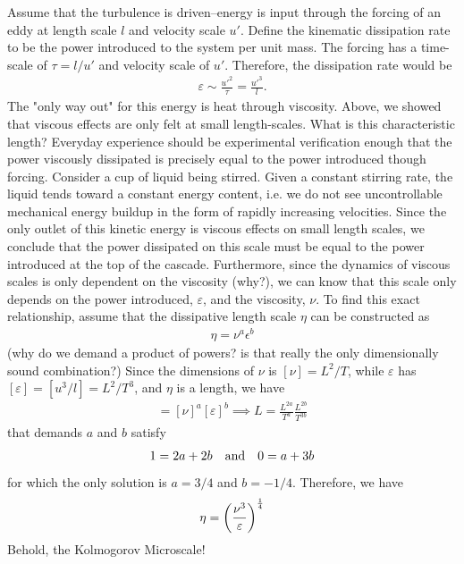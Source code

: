 \documentclass[10pt]{article}
\begin{document}
Assume that the turbulence is driven--energy is input through the forcing of an eddy at length scale $l$ and velocity scale $u'$. Define the kinematic dissipation rate to be the power introduced to the system per unit mass. The forcing has a time-scale of $\tau = l/u'$ and velocity scale of $u'$. Therefore, the dissipation rate would be
\begin{align}
    \varepsilon \sim \frac{u'^2}{\tau} = \frac{u'^3}{l}.
\end{align}
The "only way out" for this energy is heat through viscosity. Above, we showed that viscous effects are only felt at small length-scales. What is this characteristic length? Everyday experience should be experimental verification enough that the power viscously dissipated is precisely equal to the power introduced though forcing. Consider a cup of liquid being stirred. Given a constant stirring rate, the liquid tends toward a constant energy content, i.e. we do not see uncontrollable mechanical energy buildup in the form of rapidly increasing velocities. Since the only outlet of this kinetic energy is viscous effects on small length scales, we conclude that the power dissipated on this scale must be equal to the power introduced at the top of the cascade. Furthermore, since the dynamics of viscous scales is only dependent on the viscosity (why?), we can know that this scale only depends on the power introduced, $\varepsilon$, and the viscosity, $\nu$. To find this exact relationship, assume that the dissipative length scale $\eta$ can be constructed as
\begin{align}
    \eta = \nu^a\epsilon^b
\end{align}
(why do we demand a product of powers? is that really the only dimensionally sound combination?) Since the dimensions of $\nu$ is $[\nu] = L^2/T$, while $\varepsilon$ has $[\varepsilon] = [u^3/l] = L^2/T^3$, and $\eta$ is a length, we have
\begin{align}
    [\eta] = [\nu]^a[\varepsilon]^b \implies L = \frac{L^{2a}}{T^a}\frac{L^{2b}}{T^{3b}}
\end{align}
that demands $a$ and $b$ satisfy
\begin{align}
    1 = 2a + 2b \qq{and} 0 = a + 3b
\end{align}
for which the only solution is $a = 3/4$ and $b = -1/4$. Therefore, we have
\begin{align}
    \eta = \qty(\frac{\nu^3}{\varepsilon})^{\frac{1}{4}}
\end{align}
Behold, the Kolmogorov Microscale!

\nocite{*}


\end{document}
